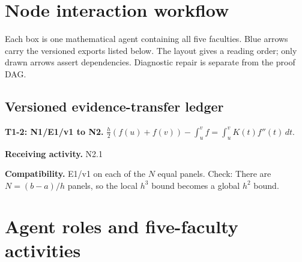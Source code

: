 \documentclass[preprint,12pt,aps,pra,showkeys,amsmath,amssymb,superscriptaddress,floatfix]{revtex4-2}
\theoremstyle{definition}
\theoremstyle{remark}
\newcommand{\field}[2]{\par\smallskip\noindent\textbf{#1.} #2\par}
\begin{document}
\clearpage\section{Node interaction workflow}

\begin{center}\end{center}

Each box is one mathematical agent containing all five faculties. Blue
arrows carry the versioned exports listed below. The layout gives a
reading order; only drawn arrows assert dependencies. Diagnostic repair
is separate from the proof DAG.

\subsection{Versioned evidence-transfer ledger}

\begingroup\small\linespread{1.05}\selectfont

\field{T1-2: N1/E1/v1 to N2}{\(\frac h2(f(u)+f(v))-\int_u^v f=\int_u^v K(t)f''(t)\,dt\).}

\field{Receiving activity}{N2.1}

\field{Compatibility}{E1/v1 on each of the \(N\) equal panels. Check: There are \(N=(b-a)/h\)
panels, so the local \(h^3\) bound becomes a global \(h^2\) bound.}

\endgroup

\clearpage\section{Agent roles and five-faculty activities}\begingroup\small\linespread{1.05}\selectfont{}
\end{document}
